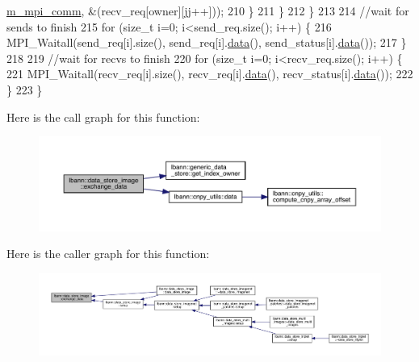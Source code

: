 \begin{DoxyCode}
      \hyperlink{classlbann_1_1generic__data__store_ae2d2d61d5d766a7f525eedcb05e0dbf6}{m\_mpi\_comm}, &(recv\_req[owner][jj++]));
210       \}
211     \}
212   \}
213 
214   \textcolor{comment}{//wait for sends to finish}
215   \textcolor{keywordflow}{for} (\textcolor{keywordtype}{size\_t} i=0; i<send\_req.size(); i++) \{
216     MPI\_Waitall(send\_req[i].size(), send\_req[i].\hyperlink{namespacelbann_1_1cnpy__utils_a9ac86d96ccb1f8b4b2ea16441738781f}{data}(), send\_status[i].\hyperlink{namespacelbann_1_1cnpy__utils_a9ac86d96ccb1f8b4b2ea16441738781f}{data}());
217   \}
218 
219   \textcolor{comment}{//wait for recvs to finish}
220   \textcolor{keywordflow}{for} (\textcolor{keywordtype}{size\_t} i=0; i<recv\_req.size(); i++) \{
221     MPI\_Waitall(recv\_req[i].size(), recv\_req[i].\hyperlink{namespacelbann_1_1cnpy__utils_a9ac86d96ccb1f8b4b2ea16441738781f}{data}(), recv\_status[i].\hyperlink{namespacelbann_1_1cnpy__utils_a9ac86d96ccb1f8b4b2ea16441738781f}{data}());
222   \}
223 \}
\end{DoxyCode}
Here is the call graph for this function\+:\nopagebreak
\begin{figure}[H]
\begin{center}
\leavevmode
\includegraphics[width=350pt]{classlbann_1_1data__store__image_a5ff5eccbd469caca692e8259f6f8c021_cgraph}
\end{center}
\end{figure}
Here is the caller graph for this function\+:\nopagebreak
\begin{figure}[H]
\begin{center}
\leavevmode
\includegraphics[width=350pt]{classlbann_1_1data__store__image_a5ff5eccbd469caca692e8259f6f8c021_icgraph}
\end{center}
\end{figure}
\mbox{\label{classlbann_1_1data__store__image_a477529f2ba3f86598bbd409d3c2b6901}} 
